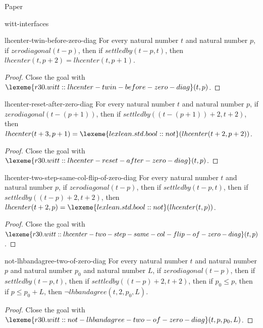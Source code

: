 \begin{lexlean}{Paper}
\begin{section}{witt-interfaces}
  \begin{theorem}{lhcenter-twin-before-zero-diag}
  For every natural number \(t\) and natural number \(p\), if \(zerodiagonal(t - p)\), then if \(settledby(t - p, t)\), then \(lhcenter(t, p + 2) = lhcenter(t, p + 1)\).
  \begin{proof}
  Close the goal with \(\lexeme{r30.witt::lhcenter-twin-before-zero-diag}(t, p)\).
  \end{proof}
  \end{theorem}

  \begin{theorem}{lhcenter-reset-after-zero-diag}
  For every natural number \(t\) and natural number \(p\), if \(zerodiagonal(t - (p + 1))\), then if \(settledby((t - (p + 1)) + 2, t + 2)\), then \(lhcenter(t + 3, p + 1) = \lexeme{lexlean.std.bool::not}(lhcenter(t + 2, p + 2))\).
  \begin{proof}
  Close the goal with \(\lexeme{r30.witt::lhcenter-reset-after-zero-diag}(t, p)\).
  \end{proof}
  \end{theorem}

  \begin{theorem}{lhcenter-two-step-same-col-flip-of-zero-diag}
  For every natural number \(t\) and natural number \(p\), if \(zerodiagonal(t - p)\), then if \(settledby(t - p, t)\), then if \(settledby((t - p) + 2, t + 2)\), then \(lhcenter(t + 2, p) = \lexeme{lexlean.std.bool::not}(lhcenter(t, p))\).
  \begin{proof}
  Close the goal with \(\lexeme{r30.witt::lhcenter-two-step-same-col-flip-of-zero-diag}(t, p)\).
  \end{proof}
  \end{theorem}

  \begin{theorem}{not-lhbandagree-two-of-zero-diag}
  For every natural number \(t\) and natural number \(p\) and natural number \(p_0\) and natural number \(L\), if \(zerodiagonal(t - p)\), then if \(settledby(t - p, t)\), then if \(settledby((t - p) + 2, t + 2)\), then if \(p_0 ≤ p\), then if \(p ≤ p_0 + L\), then \(¬ lhbandagree(t, 2, p_0, L)\).
  \begin{proof}
  Close the goal with \(\lexeme{r30.witt::not-lhbandagree-two-of-zero-diag}(t, p, p_0, L)\).
  \end{proof}
  \end{theorem}


\end{section}
\end{lexlean}
